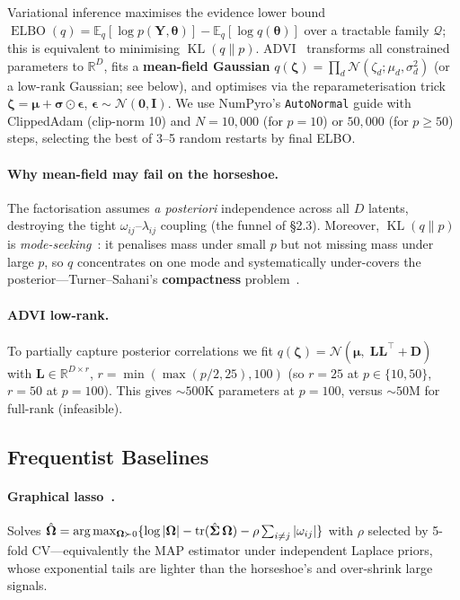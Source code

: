 \documentclass[10pt,conference,compsoc]{IEEEtran}
\newcommand{\R}{\mathbb{R}} \newcommand{\E}{\mathbb{E}} \newcommand{\Var}{\operatorname{Var}}
\newcommand{\tr}{\operatorname{tr}} \newcommand{\KL}{\operatorname{KL}} \newcommand{\ELBO}{\operatorname{ELBO}}
\newcommand{\Normal}{\mathcal{N}} \newcommand{\HalfCauchy}{\mathrm{C}^{+}} \newcommand{\InvGamma}{\mathrm{IG}}
\begin{document}
Variational inference maximises the evidence lower bound $\ELBO(q) = \E_q[\log p(\bm{Y},\bm{\theta})] - \E_q[\log q(\bm{\theta})]$ over a tractable family $\mathcal{Q}$; this is equivalent to minimising $\KL(q\|p)$. ADVI~\cite{kucukelbir2017} transforms all constrained parameters to $\R^D$, fits a \textbf{mean-field Gaussian} $q(\bm{\zeta}) = \prod_d\Normal(\zeta_d;\mu_d,\sigma_d^2)$ (or a low-rank Gaussian; see below), and optimises via the reparameterisation trick $\bm{\zeta} = \bm{\mu} + \bm{\sigma}\odot\bm{\epsilon}$, $\bm{\epsilon}\sim\Normal(\bm{0},\bm{I})$. We use NumPyro's \texttt{AutoNormal} guide with ClippedAdam (clip-norm 10) and $N=10{,}000$ (for $p{=}10$) or $50{,}000$ (for $p{\geq}50$) steps, selecting the best of 3--5 random restarts by final ELBO.

\paragraph{Why mean-field may fail on the horseshoe.} The factorisation assumes \emph{a posteriori} independence across all $D$ latents, destroying the tight $\omega_{ij}$--$\lambda_{ij}$ coupling (the funnel of §2.3). Moreover, $\KL(q\|p)$ is \emph{mode-seeking}~\cite{kucukelbir2017}: it penalises mass under small $p$ but not missing mass under large $p$, so $q$ concentrates on one mode and systematically under-covers the posterior---Turner--Sahani's \textbf{compactness} problem~\cite{turner2011}.

\paragraph{ADVI low-rank.} To partially capture posterior correlations we fit $q(\bm{\zeta}) = \Normal(\bm{\mu},\; \bm{L}\bm{L}^\top + \bm{D})$ with $\bm{L}\in\R^{D\times r}$, $r = \min(\max(p/2, 25), 100)$ (so $r{=}25$ at $p{\in}\{10,50\}$, $r{=}50$ at $p{=}100$). This gives ${\sim}500\text{K}$ parameters at $p{=}100$, versus ${\sim}50\text{M}$ for full-rank (infeasible).

\subsection{Frequentist Baselines}

\paragraph{Graphical lasso~\cite{friedman2008}.} Solves $\hat\bOmega = \arg\max_{\bOmega \succ 0}\{\log|\bOmega| - \tr(\hat\bSigma\,\bOmega) - \rho\sum_{i\neq j}|\omega_{ij}|\}$ with $\rho$ selected by 5-fold CV---equivalently the MAP estimator under independent Laplace priors, whose exponential tails are lighter than the horseshoe's and over-shrink large signals.
\end{document}
